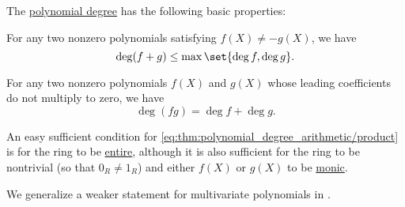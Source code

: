 \begin{proposition}\label{thm:polynomial_degree_arithmetic}
  The \hyperref[def:polynomial_degree]{polynomial degree} has the following basic properties:
  \begin{thmenum}
     For any two nonzero polynomials satisfying \( f(X) \neq -g(X) \), we have
    \begin{equation}\label{eq:thm:polynomial_degree_arithmetic/sum}
      \deg (f + g) \leq \max \set{ \deg f, \deg g }.
    \end{equation}

     For any two nonzero polynomials \( f(X) \) and \( g(X) \) whose leading coefficients do not multiply to zero, we have
    \begin{equation}\label{eq:thm:polynomial_degree_arithmetic/product}
      \deg (fg) = \deg f + \deg g.
    \end{equation}
  \end{thmenum}
\end{proposition}
\begin{comments}
  \item An easy sufficient condition for \eqref{eq:thm:polynomial_degree_arithmetic/product} is for the ring to be \hyperref[def:entire_semiring]{entire}, although it is also sufficient for the ring to be nontrivial (so that \( 0_R \neq 1_R \)) and either \( f(X) \) or \( g(X) \) to be \hyperref[def:monic_polynomial]{monic}.

  \item We generalize a weaker statement for multivariate polynomials in .
\end{comments}
